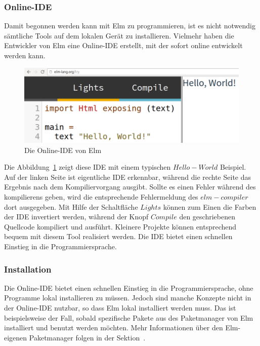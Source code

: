 \subsubsection{Online-IDE}
\label{sec:Online-IDE}
Damit begonnen werden kann mit Elm zu programmieren, ist es nicht notwendig sämtliche Tools auf dem lokalen Gerät zu installieren. Vielmehr haben die Entwickler von Elm eine Online-\ac{IDE} erstellt, mit der sofort online entwickelt werden kann.
\begin{figure}[h]
	\centering
	\includegraphics[scale=0.4]{img/elm-try.png}
	\caption{Die Online-\ac{IDE} von Elm}\label{fig:elm-try}
\end{figure}
Die Abbildung~\ref{fig:elm-try} zeigt diese \ac{IDE} mit einem typischen $Hello-World$ Beispiel. Auf der linken Seite ist eigentliche \ac{IDE} erkennbar, während die rechte Seite das Ergebnis nach dem Kompiliervorgang ausgibt. Sollte es einen Fehler während des kompilierens geben, wird die entsprechende Fehlermeldung des $elm-compiler$ dort ausgegeben. Mit Hilfe der Schaltfläche $Lights$ können zum Einen die Farben der \ac{IDE} invertiert werden, während der Knopf $Compile$ den geschriebenen Quellcode kompiliert und ausführt. Kleinere Projekte können entsprechend bequem mit diesem Tool realisiert werden. Die \ac{IDE} bietet einen schnellen Einstieg in die Programmiersprache.


\subsubsection{Installation}
\label{sec:Installation}
Die Online-\ac{IDE} bietet einen schnellen Einstieg in die Programmiersprache, ohne Programme lokal installieren zu müssen. Jedoch sind manche Konzepte nicht in der Online-\ac{IDE} nutzbar, so dass Elm lokal installiert werden muss. Das ist beispielsweise der Fall, sobald spezifische Pakete aus des Paketmanager von Elm installiert und benutzt werden möchten. Mehr Informationen über den Elm-eigenen Paketmanager folgen in der Sektion~.

